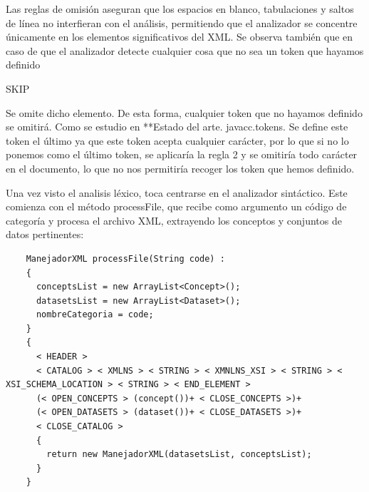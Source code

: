 Las reglas de omisión aseguran que los espacios en blanco, tabulaciones y saltos de línea no interfieran con el análisis, permitiendo que el analizador se concentre únicamente en los elementos significativos del XML. Se observa también que en caso de que el analizador detecte cualquier cosa que no sea un token que hayamos definido

SKIP

Se omite dicho elemento. De esta forma, cualquier token que no hayamos definido se omitirá. Como se estudio en **Estado del arte. javacc.tokens. Se define este token el último ya que este token acepta cualquier carácter, por lo que si no lo ponemos como el último token, se aplicaría la regla 2 y se omitiría todo carácter en el documento, lo que no nos permitiría recoger los token que hemos definido.


Una vez visto el analisis léxico, toca centrarse en el analizador sintáctico. Este comienza con el método processFile, que recibe como argumento un código de categoría y procesa el archivo XML, extrayendo los conceptos y conjuntos de datos pertinentes:

\lstset{inputencoding=utf8/latin1}
\begin{lstlisting}
    ManejadorXML processFile(String code) :
    {
      conceptsList = new ArrayList<Concept>();
      datasetsList = new ArrayList<Dataset>();
      nombreCategoria = code;
    }
    {
      < HEADER > 
      < CATALOG > < XMLNS > < STRING > < XMNLNS_XSI > < STRING > < XSI_SCHEMA_LOCATION > < STRING > < END_ELEMENT >
      (< OPEN_CONCEPTS > (concept())+ < CLOSE_CONCEPTS >)+
      (< OPEN_DATASETS > (dataset())+ < CLOSE_DATASETS >)+
      < CLOSE_CATALOG >
      {
        return new ManejadorXML(datasetsList, conceptsList);
      }
    }
    
\end{lstlisting}

